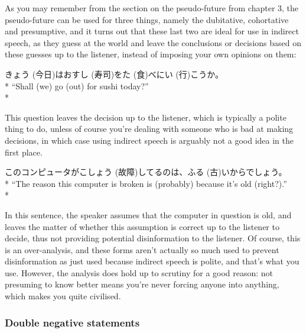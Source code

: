 \documentclass[11pt, b5paper, twoside, openright, onecolumn]{book}
\makeatletter
\newcommand*{\rubystack}[2]{{\relscale{0.5}%
  \begin{tabular}[b]{@{}c@{}}%
    {#1}\\%
   {\textscale{2}{#2}}%
  \end{tabular}}%
}
\DeclareRobustCommand*{\ruby}[2]{%
  \mbox{%
    \setlength{\parskip}{0ex}%
    \BeginAccSupp{method=pdfstringdef,ActualText={#1}}%
      \rubystack{\phantom{#2}}{#1}%
      \llap{%
        \rubystack{#2}{\phantom{#1}}%
      }%
    \EndAccSupp{}%
  }%
}
\renewcommand*{\ruby}[2]{#2 (#1)}%
\newenvironment{exampleblock}{
\setlength{\parindent}{0.6in}
\begin{minipage}[t]{\dimexpr\textwidth-\parindent}}
{\end{minipage}}
\makeatother
\begin{document}
As you may remember from the section on the pseudo-future from chapter 3‚ the pseudo-future can be used for three things‚ namely the dubitative‚ cohortative and presumptive‚ and it turns out that these last two are ideal for use in indirect speech‚ as they guess at the world and leave the conclusions or decisions based on these guesses up to the listener‚ instead of imposing your own opinions on them:

\vspace{0.4cm}
\begin{exampleblock}
\ruby{今日}{きょう}はお\ruby{寿司}{すし}を\ruby{食}{た}べに\ruby{行}{い}こうか。 \\* 
“Shall (we) go (out) for sushi today?” \\* 
\end{exampleblock}
\vspace{0.2cm}

This question leaves the decision up to the listener‚ which is typically a polite thing to do‚ unless of course you’re dealing with someone who is bad at making decisions‚ in which case using indirect speech is arguably not a good idea in the first place.

\vspace{0.4cm}
\begin{exampleblock}
このコンピュータが\ruby{故障}{こしょう}してるのは、\ruby{古}{ふる}いからでしょう。 \\* 
“The reason this computer is broken is (probably) because it’s old (right?).” \\* 
\end{exampleblock}
\vspace{0.2cm}

In this sentence‚ the speaker assumes that the computer in question is old‚ and leaves the matter of whether this assumption is correct up to the listener to decide‚ thus not providing potential disinformation to the listener. Of course‚ this is an over-analysis‚ and these forms aren’t actually so much used to prevent disinformation as just used because indirect speech is polite‚ and that’s what you use. However‚ the analysis does hold up to scrutiny for a good reason: not presuming to know better means you’re never forcing anyone into anything‚ which makes you quite civilised.

\subsubsection{Double negative statements}
\end{document}
